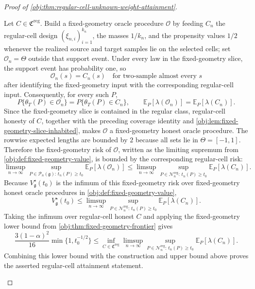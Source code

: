 \documentclass[11pt]{article}
\begin{document}
\begin{proof}[Proof of \cref{obj:thm:regular-cell-unknown-weight-attainment}]
\begin{enumerate}
Let \(C\in\mathfrak C^{\mathrm{reg}}\). Build a fixed-geometry oracle procedure \(\mathcal O\) by feeding \(C_n\) the regular-cell design \((\xi_{n,i})_{i=1}^{k_n}\), the masses \(1/k_n\), and the propensity values \(1/2\) whenever the realized source and target samples lie on the selected cells; set \(\mathcal O_n=\Theta\) outside that support event. Under every law in the fixed-geometry slice, the support event has probability one, so
\[
\mathcal O_n(s)=C_n(s)
\quad\text{for two-sample almost every }s
\]
after identifying the fixed-geometry input with the corresponding regular-cell input. Consequently, for every such \(P\),
\[
P\{\theta_T(P)\in\mathcal O_n\}
=
P\{\theta_T(P)\in C_n\},
\qquad
\mathbb E_P[\lambda(\mathcal O_n)]
=
\mathbb E_P[\lambda(C_n)].
\]
Since the fixed-geometry slice is contained in the regular class, regular-cell honesty of \(C\), together with the preceding coverage identity and \cref{obj:lem:fixed-geometry-slice-inhabited}, makes \(\mathcal O\) a fixed-geometry honest oracle procedure. The rowwise expected lengths are bounded by \(2\) because all sets lie in \(\Theta=[-1,1]\). Therefore the fixed-geometry risk of \(\mathcal O\), written as the limiting supremum from \cref{obj:def:fixed-geometry-value}, is bounded by the corresponding regular-cell risk:
\[
\limsup_{n\to\infty}
\sup_{P\in\mathcal P_n(\mathfrak g):\,t_n(P)\ge t_0}
\mathbb E_P[\lambda(\mathcal O_n)]
\le
\limsup_{n\to\infty}
\sup_{P\in\mathcal N_n^{\mathrm{reg}}:\,t_n(P)\ge t_0}
\mathbb E_P[\lambda(C_n)] .
\]
Because \(V_{\mathfrak g}^\star(t_0)\) is the infimum of this fixed-geometry risk over fixed-geometry honest oracle procedures in \cref{obj:def:fixed-geometry-value},
\[
V_{\mathfrak g}^\star(t_0)
\le
\limsup_{n\to\infty}
\sup_{P\in\mathcal N_n^{\mathrm{reg}}:\,t_n(P)\ge t_0}
\mathbb E_P[\lambda(C_n)].
\]
Taking the infimum over regular-cell honest \(C\) and applying the fixed-geometry lower bound from \cref{obj:thm:fixed-geometry-frontier} gives
\[
\frac{3(1-\alpha)^2}{16}\min\{1,t_0^{-1/2}\}
\le
\inf_{C\in\mathfrak C^{\mathrm{reg}}}
\limsup_{n\to\infty}
\sup_{P\in\mathcal N_n^{\mathrm{reg}}:\,t_n(P)\ge t_0}
\mathbb E_P[\lambda(C_n)] .
\]
Combining this lower bound with the construction and upper bound above proves the asserted regular-cell attainment statement. %
\end{enumerate}
\end{proof}




\end{document}

